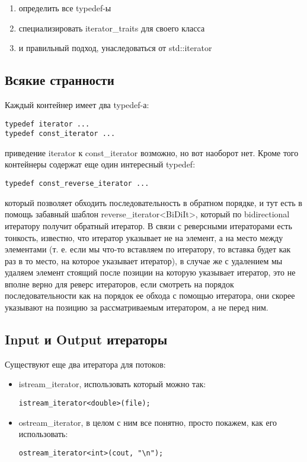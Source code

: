 \begin{enumerate}
\item определить все typedef-ы

\item специализировать iterator\_traits для своего класса

\item и правильный подход, унаследоваться от std::iterator
\end{enumerate}

\subsection{Всякие странности}

Каждый контейнер имеет два typedef-а:
\begin{lstlisting}
typedef iterator ...
typedef const_iterator ...
\end{lstlisting}
приведение iterator к const\_iterator возможно, но вот наоборот нет. Кроме того контейнеры содержат еще один интересный typedef:
\begin{lstlisting}
typedef const_reverse_iterator ...
\end{lstlisting}
который позволяет обходить последовательность в обратном порядке, и тут есть в помощь забавный шаблон reverse\_iterator<BiDiIt>, который по bidirectional
итератору получит обратный итератор. В связи с реверсными итераторами есть тонкость, известно, что итератор указывает не на элемент, а на место между элементами
(т. е. если мы что-то вставляем по итератору, то вставка будет как раз в то место, на которое указывает итератор), в случае же с удалением мы удаляем элемент
стоящий после позиции на которую указывает итератор, это не вполне верно для реверс итераторов, если смотреть на порядок последовательности как на порядок ее
обхода с помощью итератора, они скорее указывают на позицию за рассматриваемым итератором, а не перед ним.

\subsection{Input и Output итераторы}

Существуют еще два итератора для потоков:
\begin{itemize}
\item istream\_iterator, использовать который можно так:
\begin{lstlisting}
istream_iterator<double>(file);
\end{lstlisting}

\item ostream\_iterator, в целом с ним все понятно, просто покажем, как его использовать:
\begin{lstlisting}
ostream_iterator<int>(cout, "\n");
\end{lstlisting}
\end{itemize}

